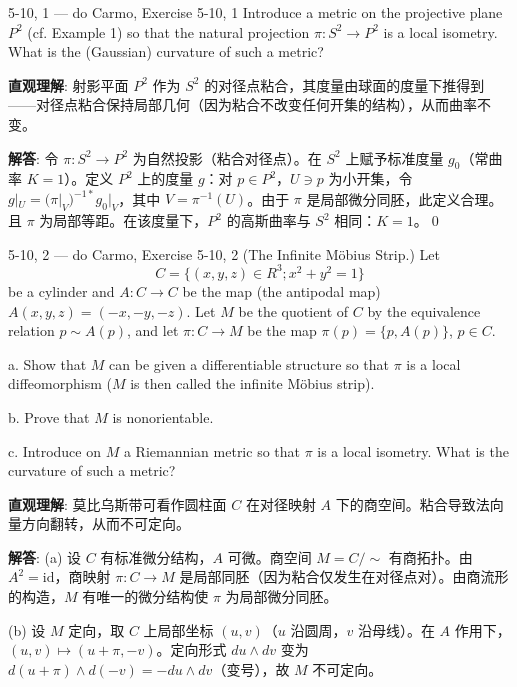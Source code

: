 \begin{Remark}
\begin{exercise}{5-10, 1 — do Carmo, Exercise 5-10, 1}
Introduce a metric on the projective plane $P^2$ (cf. Example 1) so that the natural projection $\pi \colon S^2 \to P^2$ is a local isometry. What is the (Gaussian) curvature of such a metric?
\end{exercise}
\begin{solution}
\textbf{直观理解}: 射影平面 $P^2$ 作为 $S^2$ 的对径点粘合，其度量由球面的度量下推得到——对径点粘合保持局部几何（因为粘合不改变任何开集的结构），从而曲率不变。

\textbf{解答}: 令 $\pi: S^2\to P^2$ 为自然投影（粘合对径点）。在 $S^2$ 上赋予标准度量 $g_0$（常曲率 $K=1$）。定义 $P^2$ 上的度量 $g$：对 $p\in P^2$，$U\ni p$ 为小开集，令 $g|_U = (\pi|_V)^{-1*}g_0|_V$，其中 $V=\pi^{-1}(U)$。由于 $\pi$ 是局部微分同胚，此定义合理。且 $\pi$ 为局部等距。在该度量下，$P^2$ 的高斯曲率与 $S^2$ 相同：$K=1$。\qed
\end{solution}

\begin{exercise}{5-10, 2 — do Carmo, Exercise 5-10, 2}
(The Infinite Möbius Strip.) Let
\[
C = \{(x, y, z) \in R ^ {3}; x ^ {2} + y ^ {2} = 1 \}
\]
be a cylinder and $A \colon C \to C$ be the map (the antipodal map) $A(x, y, z) = (-x, -y, -z)$. Let $M$ be the quotient of $C$ by the equivalence relation $p \sim A(p)$, and let $\pi \colon C \to M$ be the map $\pi(p) = \{p, A(p)\}$, $p \in C$.

a. Show that $M$ can be given a differentiable structure so that $\pi$ is a local diffeomorphism ($M$ is then called the infinite Möbius strip).

b. Prove that $M$ is nonorientable.

c. Introduce on $M$ a Riemannian metric so that $\pi$ is a local isometry. What is the curvature of such a metric?
\end{exercise}
\begin{solution}
\textbf{直观理解}: 莫比乌斯带可看作圆柱面 $C$ 在对径映射 $A$ 下的商空间。粘合导致法向量方向翻转，从而不可定向。

\textbf{解答}: (a) 设 $C$ 有标准微分结构，$A$ 可微。商空间 $M=C/\sim$ 有商拓扑。由 $A^2=\mathrm{id}$，商映射 $\pi: C\to M$ 是局部同胚（因为粘合仅发生在对径点对）。由商流形的构造，$M$ 有唯一的微分结构使 $\pi$ 为局部微分同胚。

(b) 设 $M$ 定向，取 $C$ 上局部坐标 $(u,v)$（$u$ 沿圆周，$v$ 沿母线）。在 $A$ 作用下，$(u,v)\mapsto(u+\pi,-v)$。定向形式 $du\wedge dv$ 变为 $d(u+\pi)\wedge d(-v)=-du\wedge dv$（变号），故 $M$ 不可定向。


\end{solution}
\end{Remark}
